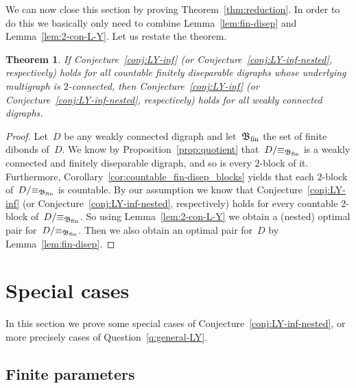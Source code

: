 \documentclass[reqno, 12pt]{amsart}
\numberwithin{equation}{section}
\numberwithin{figure}{section}
\theoremstyle{plain}
\newtheorem{theorem}[thm]{Theorem}
\theoremstyle{definition}
\begin{document}
We can now close this section by proving Theorem~\ref{thm:reduction}.
In order to do this we basically only need to combine Lemma~\ref{lem:fin-disep} and Lemma~\ref{lem:2-con-L-Y}.
Let us restate the theorem.

\setcounter{section}{1}
\setcounter{thm}{5}

\begin{theorem}
    If Conjecture~\ref{conj:LY-inf} (or Conjecture~\ref{conj:LY-inf-nested}, respectively) holds for all countable finitely diseparable digraphs whose underlying multigraph is $2$-connected, then Conjecture~\ref{conj:LY-inf} (or Conjecture~\ref{conj:LY-inf-nested}, respectively) holds for all weakly connected digraphs. 
\end{theorem}

\setcounter{section}{4}
\setcounter{thm}{2}

\begin{proof}
    Let~$D$ be any weakly connected digraph 
    and let~${\mathfrak{B}_\textnormal{fin}}$ the set of finite dibonds of~$D$.
    We know by Proposition~\ref{prop:quotient} that~${D{/}{\equiv_{\mathfrak{B}_\textnormal{fin}}}}$ is a weakly connected and finitely diseparable digraph, and so is every $2$-block of it.
    Furthermore, Corollary~\ref{cor:countable_fin-disep_blocks} yields that each $2$-block of~${D{/}{\equiv_{\mathfrak{B}_\textnormal{fin}}}}$ is countable.
    By our assumption we know that Conjecture~\ref{conj:LY-inf} (or Conjecture~\ref{conj:LY-inf-nested}, respectively) holds for every countable $2$-block of~${D{/}{\equiv_{\mathfrak{B}_\textnormal{fin}}}}$.
    So using Lemma~\ref{lem:2-con-L-Y} we obtain a (nested) optimal pair for~${D{/}{\equiv_{\mathfrak{B}_\textnormal{fin}}}}$.
    Then we also obtain an optimal pair for~$D$ by Lemma~\ref{lem:fin-disep}.
\end{proof}



\section{Special cases}
\label{sec:cases}


In this section we prove some special cases of Conjecture~\ref{conj:LY-inf-nested}, or more precisely cases of Question~\ref{q:general-LY}. 

\subsection{Finite parameters}
\end{document}
